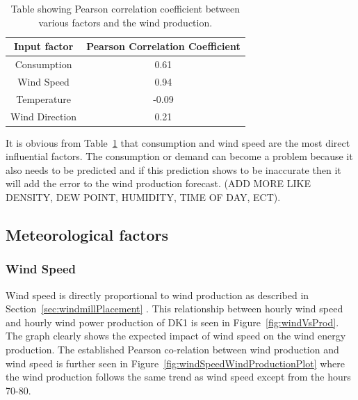 \begin{table}[H]
\centering  %
\begin{tabular}{c c} %
Input factor & Pearson Correlation Coefficient \\ [0.5ex] %
\hline                  %
Consumption & 0.61 \\ %
Wind Speed & 0.94 \\
Temperature & -0.09 \\
Wind Direction & 0.21 \\ [1ex] %
\hline %
\end{tabular}
\caption{Table showing Pearson correlation coefficient between various factors and the wind production.} %
\label{table:pearsonCoeficientWindProduction} %
\end{table}

It is obvious from Table~\ref{table:pearsonCoeficientWindProduction} that consumption and wind speed are the most direct influential factors. The consumption or demand can become a problem because it also needs to be predicted and if this prediction shows to be inaccurate then it will add the error to the wind production forecast.  (ADD MORE LIKE DENSITY, DEW POINT, HUMIDITY, TIME OF DAY, ECT).

\subsection{Meteorological factors}

\subsubsection{Wind Speed}
Wind speed is directly proportional to wind production as described in Section~\ref{sec:windmillPlacement} . This relationship between hourly wind speed and hourly wind power production of DK1 is seen in Figure~\ref{fig:windVsProd}. The graph clearly shows the expected impact of wind speed on the wind energy production. The established Pearson co-relation between wind production and wind speed is further seen in Figure~\ref{fig:windSpeedWindProductionPlot} where the wind production follows the same trend as wind speed except from the hours 70-80. 

